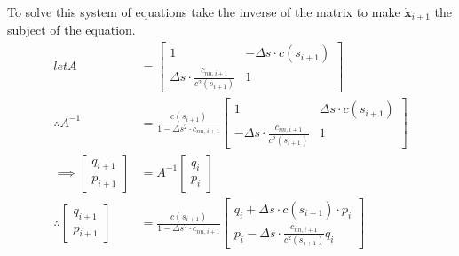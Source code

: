 \documentclass{article}
\begin{document}
To solve this system of equations take the inverse of the matrix to make $\dot{\bm{x}}_{i+1}$ the subject of the equation.
\begin{align*}
  let A &= \begin{bmatrix} 1 & -\Delta s\cdot c(s_{i+1}) \\ \Delta s\cdot\frac{c_{nn,i+1}}{c^2(s_{i+1})} & 1 \end{bmatrix}\\
  \therefore A^{-1} &= \frac{c(s_{i+1})}{1 - \Delta s^2\cdot c_{nn, i+1}} \begin{bmatrix} 1 & \Delta s\cdot c(s_{i+1}) \\ -\Delta s\cdot\frac{c_{nn,i+1}}{c^2(s_{i+1})} & 1 \end{bmatrix} \\
  \implies \begin{bmatrix} q_{i+1} \\ p_{i+1} \end{bmatrix} &= A^{-1}\begin{bmatrix}q_{i} \\ p_i \end{bmatrix}\\
  \therefore \begin{bmatrix} q_{i+1} \\ p_{i+1} \end{bmatrix} &= \frac{c(s_{i+1})}{1 - \Delta s^2\cdot c_{nn, i+1}}\begin{bmatrix} q_{i} + \Delta s\cdot c(s_{i+1})\cdot p_{i} \\ p_i -\Delta s\cdot \frac{c_{nn,i+1}}{c^2(s_{i+1})} q_i\end{bmatrix}
\end{align*}
\end{document}
